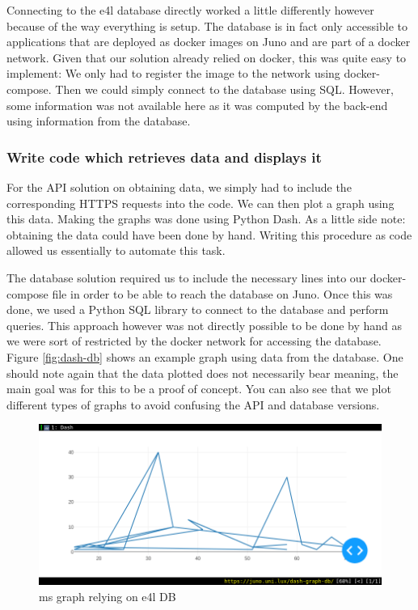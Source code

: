 Connecting to the \gls{e4l} database directly worked a little
differently however because of the way everything is setup. The
database is in fact only accessible to applications that are deployed
as docker images on Juno and are part of a docker network. Given that
our solution already relied on docker, this was quite easy to
implement: We only had to register the image to the network using
docker-compose. Then we could simply connect to the database using
SQL. However, some information was not available here as it was
computed by the back-end using information from the database.

\subsubsection{Write code which retrieves data and displays it}

For the API solution on obtaining data, we simply had to include the
corresponding HTTPS requests into the code. We can then plot a graph
using this data. Making the graphs was done using Python Dash. As a
little side note: obtaining the data could have been done by hand.
Writing this procedure as code allowed us essentially to automate this
task.

The database solution required us to include the necessary lines into
our docker-compose file in order to be able to reach the database on
Juno. Once this was done, we used a Python SQL library to connect to
the database and perform queries. This approach however was not
directly possible to be done by hand as we were sort of restricted by
the docker network for accessing the database. Figure
\vref{fig:dash-db} shows an example graph using data from the
database. One should note again that the data plotted does not
necessarily bear meaning, the main goal was for this to be a proof of
concept. You can also see that we plot different types of graphs to
avoid confusing the API and database versions.

\begin{figure}
	\centering
	\includegraphics[width=\linewidth]{images/dash-DB-demo.png}
	\caption{\gls{ms} graph relying on \gls{e4l} DB}
	\label{fig:dash-db}
\end{figure}

